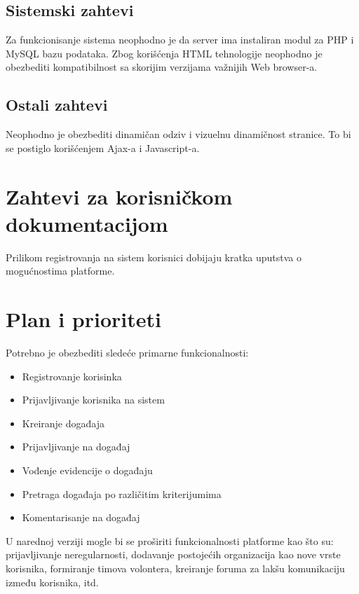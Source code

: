 \documentclass[11pt,a4paper]{article}
\begin{document}
\subsection{Sistemski zahtevi}
Za funkcionisanje sistema neophodno je da server ima instaliran modul za PHP i MySQL bazu podataka. Zbog korišćenja HTML tehnologije neophodno je obezbediti kompatibilnost sa skorijim verzijama važnijih Web browser-a.
\subsection{Ostali zahtevi}
Neophodno je obezbediti dinamičan odziv i vizuelnu dinamičnost stranice. To bi se postiglo korišćenjem Ajax-a i Javascript-a.

\section{Zahtevi za korisničkom dokumentacijom}
Prilikom registrovanja na sistem korisnici dobijaju kratka uputstva o mogućnostima platforme.

\section{Plan i prioriteti}
Potrebno je obezbediti sledeće primarne funkcionalnosti:
\begin{itemize}
  \item Registrovanje korisinka
  \item Prijavljivanje korisnika na sistem
  \item Kreiranje događaja
  \item Prijavljivanje na događaj
  \item Vođenje evidencije o događaju
  \item Pretraga događaja po različitim kriterijumima
  \item Komentarisanje  na događaj
\end{itemize}
U narednoj verziji mogle bi se proširiti funkcionalnosti platforme kao što su: prijavljivanje neregularnosti, dodavanje postojećih organizacija kao nove vrste korisnika, formiranje timova volontera, kreiranje foruma za lakšu komunikaciju između korisnika, itd.

\newpage
\end{document}
